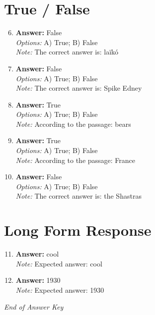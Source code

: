 \documentclass[12pt]{article}
\begin{document}
\section*{True / False}
\begin{enumerate}[label=\arabic*.]
\setcounter{enumi}{5}
\item \textbf{Answer:} False
\\ \textit{Options:} A) True; B) False
\\ \textit{Note:} The correct answer is: laïkó
\item \textbf{Answer:} False
\\ \textit{Options:} A) True; B) False
\\ \textit{Note:} The correct answer is: Spike Edney
\item \textbf{Answer:} True
\\ \textit{Options:} A) True; B) False
\\ \textit{Note:} According to the passage: bears
\item \textbf{Answer:} True
\\ \textit{Options:} A) True; B) False
\\ \textit{Note:} According to the passage: France
\item \textbf{Answer:} False
\\ \textit{Options:} A) True; B) False
\\ \textit{Note:} The correct answer is: the Shastras
\end{enumerate}

\section*{Long Form Response}
\begin{enumerate}[label=\arabic*.]
\setcounter{enumi}{10}
\item \textbf{Answer:} cool
\\ \textit{Note:} Expected answer: cool
\item \textbf{Answer:} 1930
\\ \textit{Note:} Expected answer: 1930
\end{enumerate}

\vfill
\noindent\textit{End of Answer Key}
\end{document}
